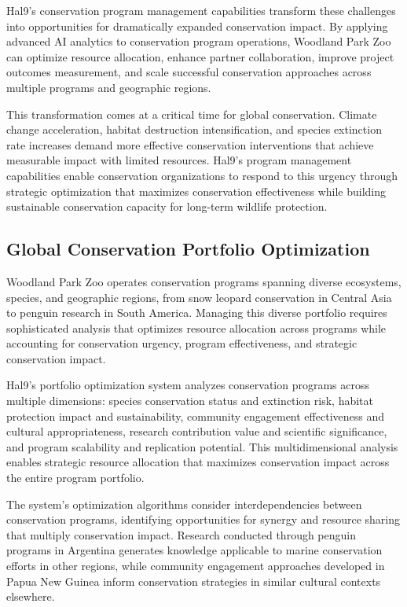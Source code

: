 \documentclass[
  Letterpaper,
]{scrbook}
\begin{document}
Hal9's conservation program management capabilities transform these
challenges into opportunities for dramatically expanded conservation
impact. By applying advanced AI analytics to conservation program
operations, Woodland Park Zoo can optimize resource allocation, enhance
partner collaboration, improve project outcomes measurement, and scale
successful conservation approaches across multiple programs and
geographic regions.

This transformation comes at a critical time for global conservation.
Climate change acceleration, habitat destruction intensification, and
species extinction rate increases demand more effective conservation
interventions that achieve measurable impact with limited resources.
Hal9's program management capabilities enable conservation organizations
to respond to this urgency through strategic optimization that maximizes
conservation effectiveness while building sustainable conservation
capacity for long-term wildlife protection.

\subsection{Global Conservation Portfolio
Optimization}\label{global-conservation-portfolio-optimization}

Woodland Park Zoo operates conservation programs spanning diverse
ecosystems, species, and geographic regions, from snow leopard
conservation in Central Asia to penguin research in South America.
Managing this diverse portfolio requires sophisticated analysis that
optimizes resource allocation across programs while accounting for
conservation urgency, program effectiveness, and strategic conservation
impact.

Hal9's portfolio optimization system analyzes conservation programs
across multiple dimensions: species conservation status and extinction
risk, habitat protection impact and sustainability, community engagement
effectiveness and cultural appropriateness, research contribution value
and scientific significance, and program scalability and replication
potential. This multidimensional analysis enables strategic resource
allocation that maximizes conservation impact across the entire program
portfolio.

The system's optimization algorithms consider interdependencies between
conservation programs, identifying opportunities for synergy and
resource sharing that multiply conservation impact. Research conducted
through penguin programs in Argentina generates knowledge applicable to
marine conservation efforts in other regions, while community engagement
approaches developed in Papua New Guinea inform conservation strategies
in similar cultural contexts elsewhere.
\end{document}
